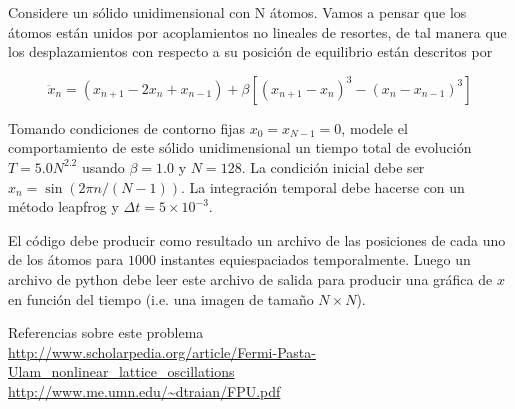 \documentclass[11pt,letterpaper]{exam}
\begin{document}
\begin{questions}

Considere un s\'olido unidimensional con N \'atomos.
Vamos a pensar que los \'atomos est\'an unidos por acoplamientos no
lineales de resortes, de tal manera que los desplazamientos con respecto
a su posici\'on de equilibrio est\'an descritos por

\begin{equation}
\ddot{x}_n = (x_{n+1} - 2x_n + x_{n-1}) + \beta[(x_{n+1}-x_n)^3 - (x_n - x_{n-1})^3]
\end{equation}

Tomando condiciones de contorno fijas $x_{0}=x_{N-1}=0$, modele el comportamiento
de este s\'olido unidimensional un tiempo total de evoluci\'on $T=5.0N^{2.2}$
usando $\beta=1.0$ y $N=128$. La condici\'on inicial debe ser
$x_n = \sin(2\pi n/(N-1))$. La integraci\'on
temporal debe hacerse con un m\'etodo leapfrog y $\Delta t=5\times 10^{-3}$.

El c\'odigo debe producir como resultado un archivo de las posiciones
de cada uno de los \'atomos para $1000$ instantes equiespaciados
temporalmente.
Luego un archivo de python debe leer este archivo de salida para
producir una gr\'afica de $x$ en funci\'on del tiempo (i.e. una imagen
de tama\~no $N\times N$). 

Referencias sobre este problema\\
\url{http://www.scholarpedia.org/article/Fermi-Pasta-Ulam_nonlinear_lattice_oscillations}\\
\url{http://www.me.umn.edu/~dtraian/FPU.pdf}\\
\end{questions}
\end{document}
